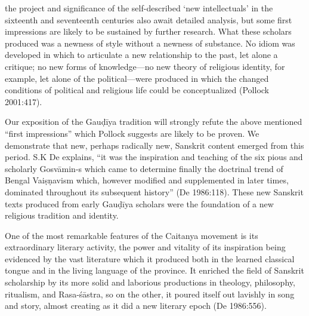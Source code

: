 \begin{myquote}
\eleven
the project and significance of the self-described ‘new intellectuals’ in the sixteenth and seventeenth centuries also await detailed analysis, but some first impressions are likely to be sustained by further research. What these scholars produced was a newness of style without a newness of substance. No idiom was developed in which to articulate a new relationship to the past, let alone a critique; no new forms of knowledge—no new theory of religious identity, for example, let alone of the political—were produced in which the changed conditions of political and religious life could be conceptualized \hfill(Pollock 2001:417). 
\end{myquote}
\vskip 2.5pt

Our exposition of the Gauḍīya tradition will strongly refute the above mentioned “first impressions” which Pollock suggests are likely to be proven. We demonstrate that new, perhaps radically new, Sanskrit content emerged from this period. S.K De explains, “it was the inspiration and teaching of the six pious and scholarly Gosvāmin-s which came to determine finally the doctrinal trend of Bengal Vaiṣṇavism which, however modified and supplemented in later times, dominated throughout its subsequent history” (De 1986:118). These new Sanskrit texts produced from early Gauḍīya scholars were the foundation of a new religious tradition and identity. 
\vskip 2.5pt

\begin{myquote}
\eleven
One of the most remarkable features of the Caitanya movement is its extraordinary literary activity, the power and vitality of its inspiration being evidenced by the vast literature which it produced both in the learned classical tongue and in the living language of the province. It enriched the field of Sanskrit scholarship by its more solid and laborious productions in theology, philosophy, ritualism, and Rasa-śāstra, so on the other, it poured itself out lavishly in song and story, almost creating as it did a new literary epoch \hfill (De 1986:556). 
\end{myquote}


